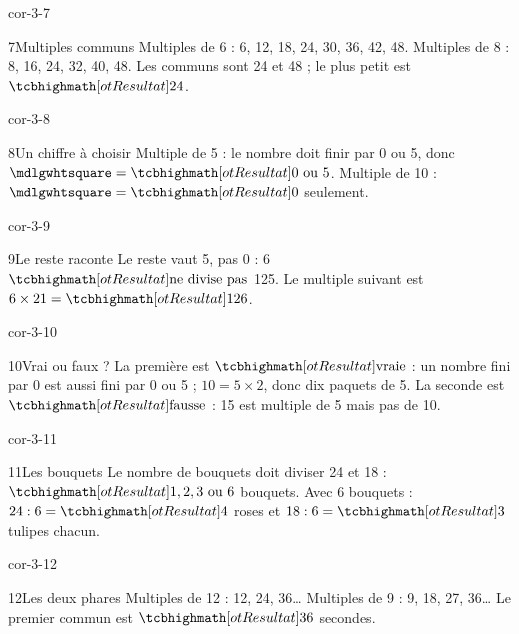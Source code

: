 \begin{blocLivre}{cor-3-7}\begin{corrige}{7}{Multiples communs}
Multiples de 6 : 6, 12, 18, 24, 30, 36, 42, 48. Multiples de 8 : 8, 16, 24, 32, 40, 48. Les communs sont 24 et 48 ; le plus petit est $\res{24}$.
\end{corrige}\end{blocLivre}
\begin{blocLivre}{cor-3-8}\begin{corrige}{8}{Un chiffre à choisir}
Multiple de 5 : le nombre doit finir par 0 ou 5, donc $\square=\res{0\text{ ou }5}$. Multiple de 10 : $\square=\res0$ seulement.
\end{corrige}\end{blocLivre}
\begin{blocLivre}{cor-3-9}\begin{corrige}{9}{Le reste raconte}
Le reste vaut 5, pas 0 : 6 $\res{\text{ne divise pas}}$ 125. Le multiple suivant est $6\times21=\res{126}$.
\end{corrige}\end{blocLivre}
\begin{blocLivre}{cor-3-10}\begin{corrige}{10}{Vrai ou faux ?}
La première est $\res{\text{vraie}}$ : un nombre fini par 0 est aussi fini par 0 ou 5 ; $10=5\times2$, donc dix paquets de 5. La seconde est $\res{\text{fausse}}$ : 15 est multiple de 5 mais pas de 10.
\end{corrige}\end{blocLivre}
\begin{blocLivre}{cor-3-11}\begin{corrige}{11}{Les bouquets}
Le nombre de bouquets doit diviser 24 et 18 : $\res{1, 2, 3\text{ ou }6}$ bouquets. Avec 6 bouquets : $24:6=\res4$ roses et $18:6=\res3$ tulipes chacun.
\end{corrige}\end{blocLivre}
\begin{blocLivre}{cor-3-12}\begin{corrige}{12}{Les deux phares}
Multiples de 12 : 12, 24, 36… Multiples de 9 : 9, 18, 27, 36… Le premier commun est $\res{36}$ secondes.
\end{corrige}\end{blocLivre}
